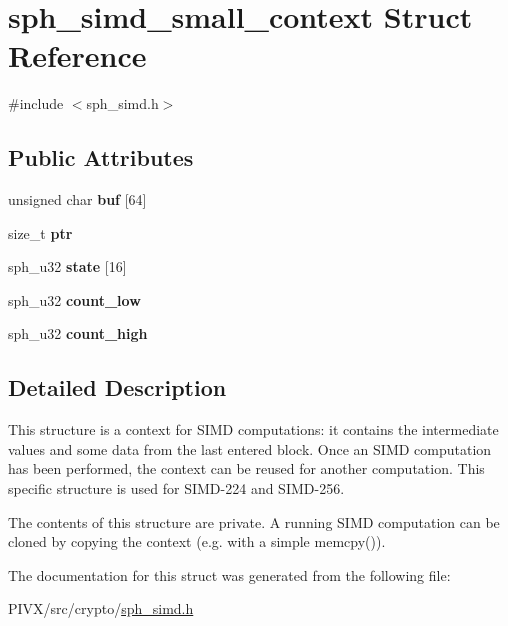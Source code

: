 \hypertarget{structsph__simd__small__context}{}\section{sph\+\_\+simd\+\_\+small\+\_\+context Struct Reference}
\label{structsph__simd__small__context}


{\ttfamily \#include $<$sph\+\_\+simd.\+h$>$}

\subsection*{Public Attributes}
\begin{DoxyCompactItemize}
\item 
\mbox{\label{structsph__simd__small__context_ad880e8f6b32fcd022c0b3bd6cf864957}} 
unsigned char {\bfseries buf} \mbox{[}64\mbox{]}
\item 
\mbox{\label{structsph__simd__small__context_ac8a2be8d4bc194be8b4cdab9cbc788b0}} 
size\+\_\+t {\bfseries ptr}
\item 
\mbox{\label{structsph__simd__small__context_a630fc1290014a94a6ba31e68075b335d}} 
sph\+\_\+u32 {\bfseries state} \mbox{[}16\mbox{]}
\item 
\mbox{\label{structsph__simd__small__context_abcf803634afa1870e3215e5f0566a20e}} 
sph\+\_\+u32 {\bfseries count\+\_\+low}
\item 
\mbox{\label{structsph__simd__small__context_aa4980f9828e1c0449f40efba36f6b903}} 
sph\+\_\+u32 {\bfseries count\+\_\+high}
\end{DoxyCompactItemize}


\subsection{Detailed Description}
This structure is a context for S\+I\+MD computations\+: it contains the intermediate values and some data from the last entered block. Once an S\+I\+MD computation has been performed, the context can be reused for another computation. This specific structure is used for S\+I\+M\+D-\/224 and S\+I\+M\+D-\/256.

The contents of this structure are private. A running S\+I\+MD computation can be cloned by copying the context (e.\+g. with a simple {\ttfamily memcpy()}). 

The documentation for this struct was generated from the following file\+:\begin{DoxyCompactItemize}
\item 
P\+I\+V\+X/src/crypto/\mbox{\hyperlink{sph__simd_8h}{sph\+\_\+simd.\+h}}\end{DoxyCompactItemize}
